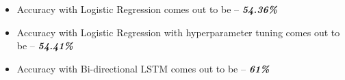 \begin{itemize}
	\item Accuracy with Logistic Regression comes out to be – \textit{\textbf{54.36\%}}
	\item Accuracy with Logistic Regression with hyperparameter tuning comes out to be – \textit{\textbf{54.41\%}}
	\item Accuracy with Bi-directional LSTM comes out to be – \textit{\textbf{61\%}}

\end{itemize}

















